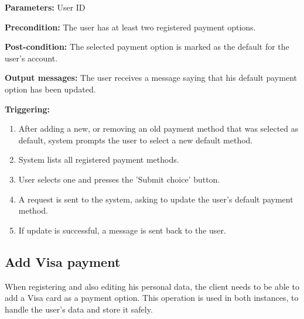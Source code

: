 \begin{description}

\item \textbf{Parameters:} User ID

\item \textbf{Precondition:} The user has at least two registered payment
options.

\item \textbf{Post-condition:} The selected payment option is marked as the
default for the user's account.

\item \textbf{Output messages:} The user receives a message saying that his
default payment option has been updated.

\item \textbf{Triggering:}
\begin{enumerate}
\item After adding a new, or removing an old payment method that was selected as
default, system prompts the user to select a new default method.

\item System lists all registered payment methods.

\item User selects one and presses the 'Submit choice' button.

\item A request is sent to the system, asking to update the user's default
payment method.

\item If update is successful, a message is sent back to the user.

\end{enumerate}

\end{description}

\subsection{Add Visa payment}

 When registering and also editing his personal data, the client needs to be
 able to add a Visa card as a payment option. This operation is used in both
 instances, to handle the user's data and store it safely.

